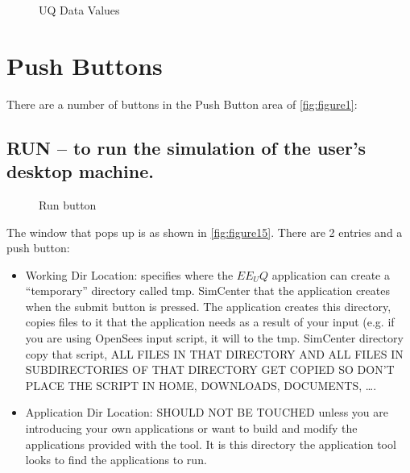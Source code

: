 \begin{figure}[!htbp]
  \caption{UQ Data Values}
  \label{fig:figure14}
\end{figure}



\section{Push Buttons}
There are a number of buttons in the Push Button area of \autoref{fig:figure1}:
\subsection{RUN – to run the simulation of the user’s desktop machine.}
\begin{figure}[!htbp]
  \caption{Run button}
  \label{fig:figure15}
\end{figure}
The window that pops up is as shown in \autoref{fig:figure15}. There are 2 entries and a push button: 

\begin{itemize}
\item Working Dir Location: specifies where the $EE_UQ$ application can create a “temporary” directory called tmp. SimCenter that the application 
creates when the submit button is pressed. The application creates this directory, copies files to it that the application needs as a result of your 
input (e.g. if you are using OpenSees input script, it will to the tmp. SimCenter directory copy that script, ALL FILES IN THAT DIRECTORY AND ALL FILES IN 
SUBDIRECTORIES OF THAT DIRECTORY GET COPIED SO DON’T PLACE THE SCRIPT IN HOME, DOWNLOADS, DOCUMENTS, ….
\item Application Dir Location: SHOULD NOT BE TOUCHED unless you are introducing your own applications or want to build and modify the 
applications provided with the tool. It is this directory the application tool looks to find the applications to run.
\end{itemize}


